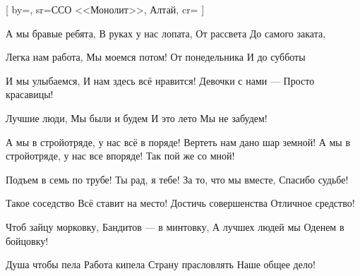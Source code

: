 [
  by={},
  sr={ССО <<Монолит>>, Алтай},
  cr={}
  ]




\beginverse
А мы бравые ребята, 
В руках у нас лопата,
От рассвета 
До самого заката,
\bqk

Легка нам работа, 
Мы моемся потом!
От понедельника 
И до субботы 
\bqk

И мы улыбаемся, 
И нам здесь всё нравится!
Девочки с нами --- 
Просто красавицы! 
\bqk

Лучшие люди, 
Мы были и будем
И это лето 
Мы не забудем!
\endverse


\beginchorus
А мы в стройотряде, у нас всё в поряде!
Вертеть нам дано шар земной!
А мы в стройотряде, у нас все впоряде!
Так пой же со мной!
\endchorus


\beginverse
Подъем в семь по трубе!
Ты рад, я тебе!
За то, что мы вместе,
Спасибо судьбе!
\bqk

Такое соседство 
Всё ставит на место!
Достичь совершенства 
Отличное средство!
\bqk

Чтоб зайцу морковку, 
Бандитов --- в минтовку,
А лучшех людей мы 
Оденем в бойцовку!
\bqk

Душа чтобы пела 
Работа кипела 
Страну прасловлять 
Наше общее дело!
\endverse


\endsong
